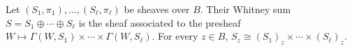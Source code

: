 Let $(S_1, \pi_1), \ldots, (S_\ell, \pi_\ell)$ be sheaves over $B$. Their Whitney sum $S = S_1 \oplus \cdots \oplus S_\ell$ is the sheaf associated to the presheaf $W \mapsto \Gamma(W, S_1) \times \cdots \times \Gamma(W, S_\ell)$. For every $z \in B$, $S_z \cong (S_1)_z \times \cdots \times (S_\ell)_z$.
